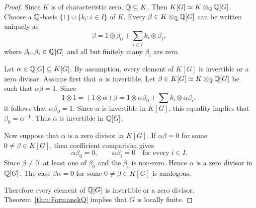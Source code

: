 \begin{proof}
	Since $K$ is of characteristic zero, $\mathbb{Q}\subseteq K$. Then $K[G]\simeq
	K\otimes_{\mathbb{Q}}\mathbb{Q}[G]$. 
	Choose a $\mathbb{Q}$-basis $\{1\}\cup\{k_i:i\in I\}$ of $K$.
	Every $\beta\in K\otimes_{\mathbb{Q}}\mathbb{Q}[G]$ can be written uniquely as
	\[
  	\beta=1\otimes\beta_0+\sum_{i\in I}k_i\otimes\beta_i,
	\]
	where $\beta_0,\beta_i\in\mathbb{Q}[G]$ and all but finitely many
	$\beta_i$ are zero.

	Let $\alpha\in\mathbb{Q}[G]\subseteq K[G]$. By assumption, every element of $K[G]$ is 
    invertible or a zero divisor. Assume first that $\alpha$ is invertible. 
    Let $\beta\in K[G]\simeq K\otimes_{\mathbb{Q}}\mathbb{Q}[G]$ be such that $\alpha\beta=1$. Since
	\[
	1\otimes 1=(1\otimes\alpha)\beta=1\otimes \alpha\beta_0+\sum k_i\otimes \alpha\beta_i,
	\]
it follows that $\alpha\beta_0=1$.
Since $\alpha$ is invertible in $K[G]$, this equality implies
that $\beta_0=\alpha^{-1}$. Thus $\alpha$ is invertible in $\mathbb{Q}[G]$.

Now suppose that $\alpha$ is a zero divisor in $K[G]$.
If $\alpha\beta=0$ for some $0\ne\beta\in K[G]$, then
coefficient comparison gives
\[
  \alpha\beta_0=0,\qquad
  \alpha\beta_i=0\quad\text{for every }i\in I.
\]
Since $\beta\ne0$, at least one of $\beta_0$ and the $\beta_i$
is non-zero. Hence $\alpha$ is a zero divisor in $\mathbb{Q}[G]$.
The case $\beta\alpha=0$ for some $0\ne\beta\in K[G]$
is analogous.

Therefore every element of $\mathbb{Q}[G]$ is invertible or a zero
divisor. Theorem~\ref{thm:FormanekQ} implies that $G$ is
locally finite.
\end{proof}


